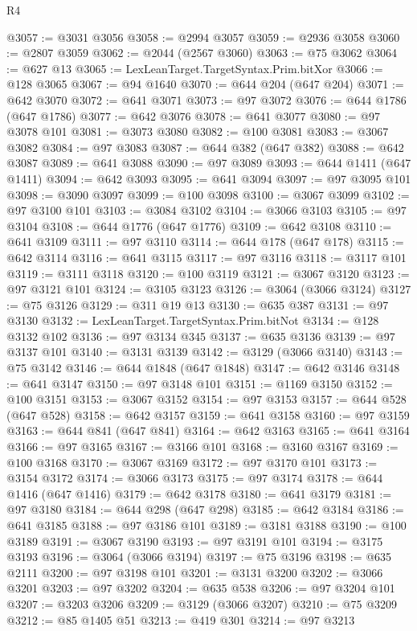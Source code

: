 \begin{lexlean}{R4}
\begin{coremodule}
@3057 := @3031 @3056
@3058 := @2994 @3057
@3059 := @2936 @3058
@3060 := @2807 @3059
@3062 := @2044 (@2567 @3060)
@3063 := @75 @3062
@3064 := @627 @13
@3065 := LexLeanTarget.TargetSyntax.Prim.bitXor
@3066 := @128 @3065
@3067 := @94 @1640
@3070 := @644 @204 (@647 @204)
@3071 := @642 @3070
@3072 := @641 @3071
@3073 := @97 @3072
@3076 := @644 @1786 (@647 @1786)
@3077 := @642 @3076
@3078 := @641 @3077
@3080 := @97 @3078 @101
@3081 := @3073 @3080
@3082 := @100 @3081
@3083 := @3067 @3082
@3084 := @97 @3083
@3087 := @644 @382 (@647 @382)
@3088 := @642 @3087
@3089 := @641 @3088
@3090 := @97 @3089
@3093 := @644 @1411 (@647 @1411)
@3094 := @642 @3093
@3095 := @641 @3094
@3097 := @97 @3095 @101
@3098 := @3090 @3097
@3099 := @100 @3098
@3100 := @3067 @3099
@3102 := @97 @3100 @101
@3103 := @3084 @3102
@3104 := @3066 @3103
@3105 := @97 @3104
@3108 := @644 @1776 (@647 @1776)
@3109 := @642 @3108
@3110 := @641 @3109
@3111 := @97 @3110
@3114 := @644 @178 (@647 @178)
@3115 := @642 @3114
@3116 := @641 @3115
@3117 := @97 @3116
@3118 := @3117 @101
@3119 := @3111 @3118
@3120 := @100 @3119
@3121 := @3067 @3120
@3123 := @97 @3121 @101
@3124 := @3105 @3123
@3126 := @3064 (@3066 @3124)
@3127 := @75 @3126
@3129 := @311 @19 @13
@3130 := @635 @387
@3131 := @97 @3130
@3132 := LexLeanTarget.TargetSyntax.Prim.bitNot
@3134 := @128 @3132 @102
@3136 := @97 @3134 @345
@3137 := @635 @3136
@3139 := @97 @3137 @101
@3140 := @3131 @3139
@3142 := @3129 (@3066 @3140)
@3143 := @75 @3142
@3146 := @644 @1848 (@647 @1848)
@3147 := @642 @3146
@3148 := @641 @3147
@3150 := @97 @3148 @101
@3151 := @1169 @3150
@3152 := @100 @3151
@3153 := @3067 @3152
@3154 := @97 @3153
@3157 := @644 @528 (@647 @528)
@3158 := @642 @3157
@3159 := @641 @3158
@3160 := @97 @3159
@3163 := @644 @841 (@647 @841)
@3164 := @642 @3163
@3165 := @641 @3164
@3166 := @97 @3165
@3167 := @3166 @101
@3168 := @3160 @3167
@3169 := @100 @3168
@3170 := @3067 @3169
@3172 := @97 @3170 @101
@3173 := @3154 @3172
@3174 := @3066 @3173
@3175 := @97 @3174
@3178 := @644 @1416 (@647 @1416)
@3179 := @642 @3178
@3180 := @641 @3179
@3181 := @97 @3180
@3184 := @644 @298 (@647 @298)
@3185 := @642 @3184
@3186 := @641 @3185
@3188 := @97 @3186 @101
@3189 := @3181 @3188
@3190 := @100 @3189
@3191 := @3067 @3190
@3193 := @97 @3191 @101
@3194 := @3175 @3193
@3196 := @3064 (@3066 @3194)
@3197 := @75 @3196
@3198 := @635 @2111
@3200 := @97 @3198 @101
@3201 := @3131 @3200
@3202 := @3066 @3201
@3203 := @97 @3202
@3204 := @635 @538
@3206 := @97 @3204 @101
@3207 := @3203 @3206
@3209 := @3129 (@3066 @3207)
@3210 := @75 @3209
@3212 := @85 @1405 @51
@3213 := @419 @301
@3214 := @97 @3213

\end{coremodule}
\end{lexlean}
